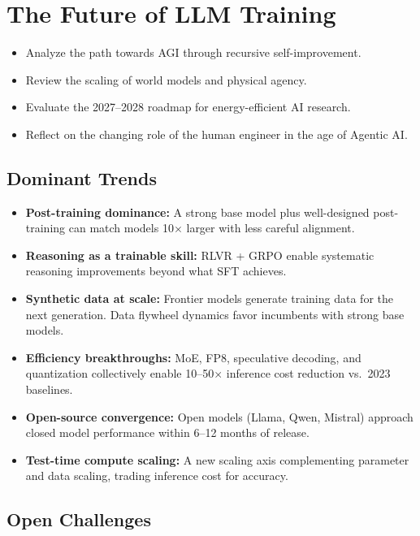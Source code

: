 \chapter{The Future of LLM Training}
\minitoc

\begin{chapteroverview}
  \begin{itemize}
    \item Analyze the path towards AGI through recursive self-improvement.
    \item Review the scaling of world models and physical agency.
    \item Evaluate the 2027--2028 roadmap for energy-efficient AI research.
    \item Reflect on the changing role of the human engineer in the age of Agentic AI.
  \end{itemize}
\end{chapteroverview}

\section{Dominant Trends}

\begin{itemize}
  \item \textbf{Post-training dominance:} A strong base model plus well-designed post-training can match models 10$\times$ larger with less careful alignment.
  \item \textbf{Reasoning as a trainable skill:} RLVR + GRPO enable systematic reasoning improvements beyond what SFT achieves.
  \item \textbf{Synthetic data at scale:} Frontier models generate training data for the next generation. Data flywheel dynamics favor incumbents with strong base models.
  \item \textbf{Efficiency breakthroughs:} MoE, FP8, speculative decoding, and quantization collectively enable 10--50$\times$ inference cost reduction vs.\ 2023 baselines.
  \item \textbf{Open-source convergence:} Open models (Llama, Qwen, Mistral) approach closed model performance within 6--12 months of release.
  \item \textbf{Test-time compute scaling:} A new scaling axis complementing parameter and data scaling, trading inference cost for accuracy.
\end{itemize}

\section{Open Challenges}

